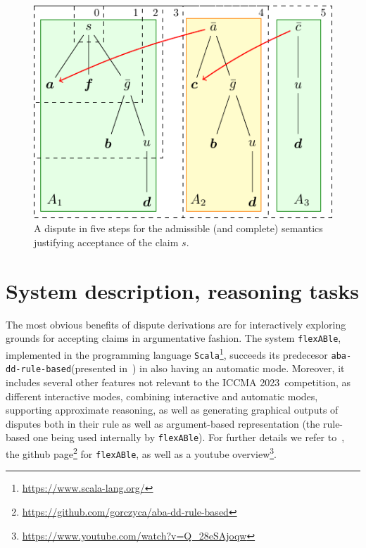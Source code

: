 \documentclass[conference]{IEEEtran}
\newcommand{\abaddrule}{\texttt{aba-dd-rule-based}\xspace}
\newcommand{\flexable}{\texttt{flexABle}\xspace}
\newcommand{\scala}{\texttt{Scala}\xspace}
\newcommand{\iccma}{ICCMA 2023}
\begin{document}
\begin{figure}
    \centering
      \centering
      \includegraphics[scale=0.8]{diagrams/diagram.pdf}
      \caption{A dispute in five steps for the admissible (and complete) semantics justifying acceptance of the claim $s$.}

    \label{fig:diagrams}
  \end{figure}




\section{System description, reasoning tasks}

The most obvious benefits of dispute derivations are for interactively exploring grounds for accepting claims in argumentative fashion.  %
The system \flexable, implemented in the programming language \scala\footnote{\url{https://www.scala-lang.org/}}, succeeds its predecesor \abaddrule (presented in~\cite{DillerGG21}) in also having an automatic mode. Moreover, it includes several other features not relevant to the \iccma~competition, as different interactive modes, combining interactive and automatic modes, supporting approximate reasoning, as well as generating graphical outputs of disputes both in their rule as well as argument-based representation (the rule-based one being used internally by \flexable).  For further details we refer to~\cite{gor22}, the github page\footnote{\url{https://github.com/gorczyca/aba-dd-rule-based}} for \flexable, as well as a youtube overview\footnote{\url{https://www.youtube.com/watch?v=Q_28eSAjoqw}}.
\end{document}
